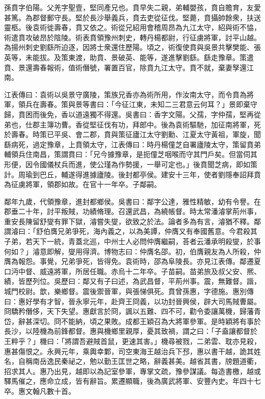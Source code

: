 
\begin{pinyinscope}
孫賁字伯陽。父羌字聖壹，堅同產兄也。賁早失二親，弟輔嬰孩，賁自贍育，友愛甚篤。為郡督郵守長。堅於長沙舉義兵，賁去吏從征伐。堅薨，賁攝帥餘衆，扶送靈柩。後袁術徙壽春，賁又依之。術從兄紹用會稽周昂為九江太守，紹與術不恊，術遣賁攻破昂於陰陵。術表賁領豫州刺史，轉丹楊都尉，行征虜將軍，討平山越。為揚州刺史劉繇所迫逐，因將士衆還住歷陽。頃之，術復使賁與吳景共擊樊能、張英等，未能拔。及策東渡，助賁、景破英、能等，遂進擊劉繇。繇走豫章。策遣賁、景還壽春報術，值術僭號，署置百官，除賁九江太守。賁不就，棄妻孥還江南。

江表傳曰：袁術以吳景守廣陵，策族兄香亦為術所用，作汝南太守，而令賁為將軍，領兵在壽春。策與景等書曰：「今征江東，未知二三君意云何耳？」景即棄守歸，賁困而後免，香以道遠獨不得還。吳書曰：香字文陽。父孺，字仲孺，堅再從弟也，仕郡主簿功曹。香從堅征伐有功，拜郎中。後為袁術驅馳，加征南將軍，死於壽春。時策已平吳、會二郡，賁與策征廬江太守劉勳、江夏太守黃祖，軍旋，聞繇病死，過定豫章，上賁領太守，江表傳曰：時丹楊僮芝自署廬陵太守，策留賁弟輔領兵住南昌，策謂賁曰：「兄今據豫章，是扼僮芝咽喉而守其門戶矣。但當伺其形便，因令國儀杖兵而進，使公瑾為作勢援，一舉可定也。」後賁聞芝病，即如策計。周瑜到巴丘，輔遂得進據廬陵。後封都亭侯。建安十三年，使者劉隱奉詔拜賁為征虜將軍，領郡如故。在官十一年卒。子鄰嗣。

鄰年九歲，代領豫章，進封都鄉侯。吳書曰：鄰字公達，雅性精敏，幼有令譽。在郡垂二十年，討平叛賊，功績脩理。召還武昌，為繞帳督。時太常潘濬掌荊州事，重安長陳留舒燮有罪下獄，濬嘗失燮，欲致之於法。論者多為有言，濬猶不釋。鄰謂濬曰：「舒伯膺兄弟爭死，海內義之，以為美譚，仲膺又有奉國舊意。今君殺其子弟，若天下一統，青蓋北巡，中州士人必問仲膺繼嗣，荅者云潘承明殺燮，於事何如？」濬意即解，燮用得濟。博物志曰：仲膺名邵。初，伯膺親友為人所殺，仲膺為報怨。事覺，兄弟爭死，皆得免。袁術時，邵為阜陵長。亦見江表傳。鄰遷夏口沔中督、威遠將軍，所居任職。赤烏十二年卒。子苗嗣。苗弟旅及叔父安、熈、績，皆歷列位。吳歷曰：鄰又有子曰述，為武昌督，平荊州事。震，無難督。諧，城門校尉。歆，樂鄉督。震後禦晉軍，與張悌俱死。賁曾孫惠，字德施。惠別傳曰：惠好學有才智，晉永寧元年，赴齊王冏義，以功封晉興侯，辟大司馬賊曹屬。冏驕矜僭侈，天下失望。惠獻言於冏，諷以五難、四不可，勸令委讓萬機，歸藩青岱，辭甚深切。冏不能納，頃之果敗。成都王穎召為大將軍參軍。是時穎將有事於長沙，以陸機為前鋒都督。惠與機鄉里親厚，憂其致禍，謂之曰：「子盍讓都督於王粹乎？」機曰：「將謂吾避賊首鼠，更速其害。」機尋被戮，二弟雲、耽亦見殺，惠甚傷恨之。永興元年，乘輿幸鄴，司空東海王越治兵下邳，惠以書干越，詭其姓名，自稱南岳逸民秦祕之，勉以勤王匡世之略，辭義甚美。越省其書，牓題道衢，招求其人。惠乃出見，越即以為記室參軍，專掌文疏，豫參謀議。每造書檄，越或驛馬催之，應命立成，皆有辭旨。累遷顯職，後為廣武將軍、安豐內史。年四十七卒。惠文翰凡數十首。


\end{pinyinscope}